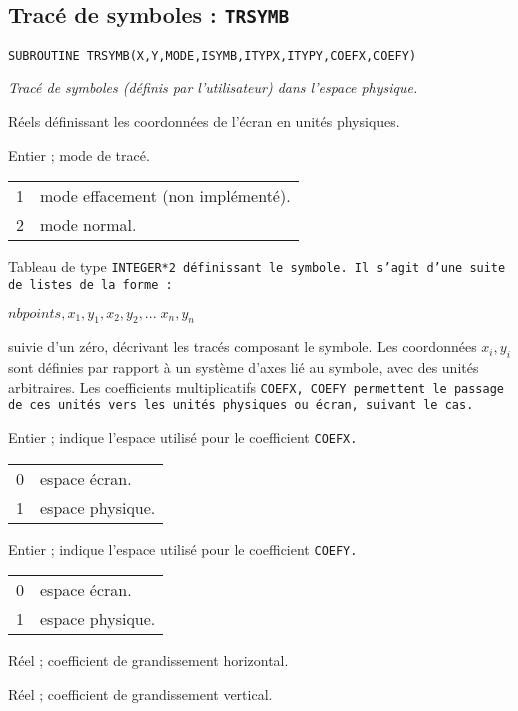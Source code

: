 \documentclass[a4paper,12pt,titlepage]{article}
\newcommand{\darg}[1]{\item[\tt #1\rm]}
\newcommand{\fsub}[1]{\hbox {\tt SUBROUTINE #1  } \medskip }
\newenvironment{argdesc}{\begin{list}{-}{\leftmargin 8em \labelwidth 7em}}%
{\end{list}}
\begin{document}
\subsection{Trac\'e de symboles : \tt TRSYMB}
\fsub{TRSYMB(X,Y,MODE,ISYMB,ITYPX,ITYPY,COEFX,COEFY)}

    \em Trac\'e  de symboles (d\'efinis par l'utilisateur)  dans  l'espace 
physique.\em

\begin{argdesc}
    \darg{X,Y :} R\'eels  d\'efinissant  les coordonn\'ees  de  l'\'ecran  en 
              unit\'es physiques. 
    \darg{MODE :}  Entier ;  mode de trac\'e.

              \begin{center}\begin{tabular}{ll}
              1 &   mode effacement (non impl\'ement\'e).\\
              2 &   mode normal.\\
              \end{tabular}\end{center}
    \darg{ISYMB :} Tableau de type \tt INTEGER*2\rm\ d\'efinissant le symbole. Il 
              s'agit d'une suite de listes de la forme :

                   \centerline{$nbpoints,x_1,y_1,x_2,y_2,...\;x_n,y_n$}
	      \noindent suivie d'un z\'ero, d\'ecrivant les trac\'es
	      composant le symbole.  Les coordonn\'ees $x_i,y_i$ sont d\'efinies
	      par rapport \`a un syst\`eme d'axes li\'e au symbole, avec
	      des unit\'es arbitraires.  Les coefficients multiplicatifs
	      \tt COEFX, COEFY\rm\ permettent le passage de ces unit\'es vers les
	      unit\'es physiques ou \'ecran, suivant le cas. 
    \darg{ITYPX :} Entier ;  indique l'espace utilis\'e pour le coefficient 
              \tt COEFX\rm.

              \begin{center}\begin{tabular}{ll}
              0 &   espace \'ecran.\\
              1 &   espace physique.\\
              \end{tabular}\end{center}
    \darg{ITYPY :} Entier ;  indique l'espace utilis\'e pour le coefficient 
              \tt COEFY\rm.

              \begin{center}\begin{tabular}{ll}
              0 &   espace \'ecran.\\
              1 &   espace physique.\\
              \end{tabular}\end{center}
    \darg{COEFX :} R\'eel ;  coefficient de grandissement horizontal.
    \darg{COEFY :} R\'eel ;  coefficient de grandissement vertical.
\end{argdesc}
\end{document}
